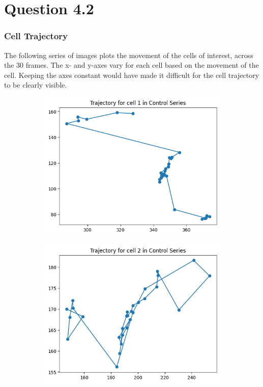 \documentclass{article}
\begin{document}
\newpage
\section*{Question 4.2}
\subsubsection*{Cell Trajectory}
The following series of images plots the movement of the cells of interest, across the 30 frames. The x- and y-axes vary for each cell based on the movement of the cell. Keeping the axes constant would have made it difficult for the cell trajectory to be clearly visible. 
\begin{figure}[h!]
    \centering
    \begin{subfigure}[b]{0.5\linewidth}
        \centering
        \includegraphics[width=\linewidth]{Report/Appendix_Images/Trajectory-A-Control/trajectory_1.png}       
    \end{subfigure}%
    \begin{subfigure}[b]{0.5\linewidth}
        \centering
        \includegraphics[width=\linewidth]{Report/Appendix_Images/Trajectory-A-Control/trajectory_2.png}

\end{subfigure}
\end{figure}
\end{document}
